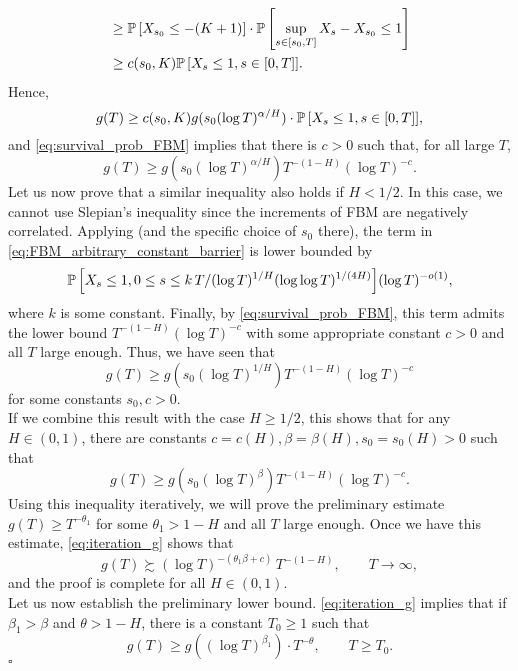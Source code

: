 \documentclass[11pt]{article}
\theoremstyle{plain}
\theoremstyle{definition}
\renewenvironment{proof}[1][] {\smallskip \noindent {\bf Proof#1.} }{\hspace*{\fill}$\square$\medskip\par}
\begin{document}
\begin{proof}
\begin{align*}
&\ge {{{\bf {\mathbb{P}}}}\left[{X_{s_0} \le -(K+1)}\right]} \cdot {{{\bf {\mathbb{P}}}}\left[{ \sup_{s \in [s_0,T]} X_s - X_{s_0} \le 1}\right]} \\
&\ge c(s_0,K) {{{\bf {\mathbb{P}}}}\left[{X_s \le 1, s \in [0,T]}\right]}.
\end{align*}
Hence,
\[
 g(T) \ge c(s_0,K) g(s_0 (\log T)^{\alpha/H}) \cdot {{{\bf {\mathbb{P}}}}\left[{X_s \le 1, s \in [0,T]}\right]},
\]
and \eqref{eq:survival_prob_FBM} implies that there is $c > 0$ such that, for all large $T$,
\[
   g(T) \ge g(s_0 (\log T)^{\alpha/H}) T^{-(1-H)} (\log T)^{-c}.
\]
Let us now prove that a similar inequality also holds if $H < 1/2$. In this case, we cannot use Slepian's inequality since the increments of FBM are negatively correlated. Applying \cite[Lemmma~5]{aurzada:2011} (and the specific choice of $s_0$ there), the term in \eqref{eq:FBM_arbitrary_constant_barrier} is lower bounded by
$$
{{{\bf {\mathbb{P}}}}\left[{ X_{s} \leq 1, 0 \leq s \leq k\, T/(\log T)^{1/H} (\log \log T)^{1/(4H)}}\right]} (\log T)^{-o(1)},
$$
where $k$ is some constant. Finally, by \eqref{eq:survival_prob_FBM}, this term admits the lower bound $T^{-(1-H)} (\log T)^{-c}$
with some appropriate constant $c>0$ and all $T$ large enough. Thus, we have seen that
\begin{equation}
g(T)\geq g(s_0 ( \log T)^{1/H} ) T^{-(1-H)} (\log T)^{-c}
\end{equation}
for some constants $s_0,c>0$.\\
If we combine this result with the case $H \ge 1/2$, this shows that for any $H \in (0,1)$, there are constants $c = c(H), \beta = \beta(H), s_0 = s_0(H) > 0$ such that
\begin{equation}\label{eq:iteration_g}
g(T)\geq g(s_0 ( \log T)^\beta ) T^{-(1-H)} (\log T)^{-c}.
\end{equation}
Using this inequality iteratively, we will prove the preliminary estimate $g(T) \ge T^{-\theta_1}$ for some $\theta_1 > 1 - H$ and all $T$ large enough. Once we have this estimate, \eqref{eq:iteration_g} shows that 
\[
   g(T) \succsim (\log T)^{-(\theta_1 \beta + c)} \, T^{-(1-H)}, \qquad T \to \infty, 
\]
and the proof is complete for all $H \in (0,1)$. \\
Let us now establish the preliminary lower bound. \eqref{eq:iteration_g} implies that if $\beta_1 > \beta$ and $\theta > 1-H$, there is a constant $T_0 \ge 1$ such that
\begin{equation}\label{eq:iteration_g_simple}
   g(T) \ge g((\log T)^{\beta_1}) \cdot T^{-\theta}, \qquad T \ge T_0.

\end{equation}
\end{proof}
\end{document}
